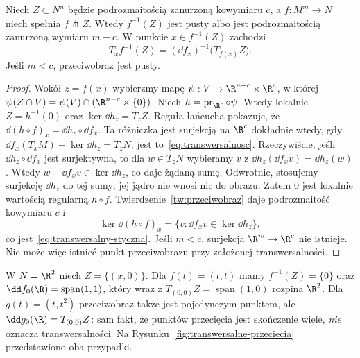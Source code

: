 \begin{twierdzenie}
\label{thm:transwersalny-przeciwobraz}
Niech $Z\subset N^n$ będzie podrozmaitością
zanurzoną kowymiaru $c$, a $f:M^m\to N$
niech spełnia $f\pitchfork Z$. Wtedy
$f^{-1}(Z)$ jest pusty albo jest
podrozmaitością zanurzoną wymiaru $m-c$.
W punkcie $x\in f^{-1}(Z)$ zachodzi
\begin{equation}\label{eq:transwersalny-styczna}
 T_xf^{-1}(Z)
  =(\dd f_x)^{-1}\bigl(T_{f(x)}Z\bigr).
\end{equation}
Jeśli $m<c$, przeciwobraz jest pusty.
\end{twierdzenie}
\begin{proof}
Wokół $z=f(x)$ wybierzmy mapę
$\psi:V\to\R^{n-c}\times\R^c$, w której
$\psi(Z\cap V)=\psi(V)\cap(\R^{n-c}\times\{0\})$.
Niech $h=\operatorname{pr}_{\R^c}\circ\psi$.
Wtedy lokalnie $Z=h^{-1}(0)$ oraz
$\ker\dd h_z=T_zZ$.
Reguła łańcucha pokazuje, że
$\dd(h\circ f)_x=\dd h_z\circ\dd f_x$.
Ta różniczka jest surjekcją na $\R^c$
dokładnie wtedy, gdy
$\dd f_x(T_xM)+\ker\dd h_z=T_zN$;
jest to~\eqref{eq:transwersalnosc}.
Rzeczywiście, jeśli $\dd h_z\circ\dd f_x$ jest surjektywna,
to dla $w\in T_zN$ wybieramy $v$ z
$\dd h_z(\dd f_xv)=\dd h_z(w)$.
Wtedy $w-\dd f_xv\in\ker\dd h_z$, co daje żądaną sumę.
Odwrotnie, stosujemy surjekcję $\dd h_z$ do tej sumy;
jej jądro nie wnosi nic do obrazu.
Zatem $0$ jest lokalnie wartością regularną
$h\circ f$. Twierdzenie~\ref{tw:przeciwobraz}
daje podrozmaitość kowymiaru $c$ i
\[
 \ker\dd(h\circ f)_x
  =\{v:\dd f_xv\in\ker\dd h_z\},
\]
co jest~\eqref{eq:transwersalny-styczna}.
Jeśli $m<c$, surjekcja $\R^m\to\R^c$
nie istnieje. Nie może więc istnieć punkt
przeciwobrazu przy założonej transwersalności.
\end{proof}

\begin{przyklad}
W $N=\R^2$ niech $Z=\{(x,0)\}$.
Dla $f(t)=(t,t)$ mamy
$f^{-1}(Z)=\{0\}$ oraz
$\dd f_0(\R)=\operatorname{span}(1,1)$,
który wraz z $T_{(0,0)}Z=\operatorname{span}(1,0)$
rozpina $\R^2$. Dla $g(t)=(t,t^2)$
przeciwobraz także jest pojedynczym punktem,
ale $\dd g_0(\R)=T_{(0,0)}Z$:
sam fakt, że punktów przecięcia jest skończenie
wiele, \emph{nie} oznacza transwersalności.
Na Rysunku~\ref{fig:transwersalne-przeciecia}
przedstawiono oba przypadki.
\end{przyklad}

